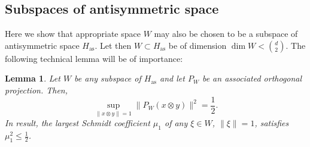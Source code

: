 \documentclass[reqno]{amsart}
\theoremstyle{plain}
\newtheorem{lemma}[theorem]{Lemma}
\theoremstyle{note}
\newcommand{\aspace}{H_{\mathrm{as}}}
\begin{document}
\subsection{Subspaces of antisymmetric space}
\label{sec:subspaces}

Here we show that appropriate space $W$ may also be chosen to be a subspace of antisymmetric space $\aspace$. Let then $W\subset\aspace$ be of dimension $\dim{W} < \binom{d}{2}$. The following technical lemma will be of importance:
\begin{lemma}\label{lemma:SchmidtOfHasSubspace}
Let $W$ be any subspace of $\aspace$ and let $P_W$ be an associated orthogonal projection. Then,
\begin{equation}
    \sup_{\|x \otimes y\| = 1}{\|P_W (x\otimes y)\|^{2}} = \frac{1}{2}.
\end{equation}
In result, the largest Schmidt coefficient $\mu_1$ of any $\xi\in W$, $\|\xi\| = 1$, satisfies $\mu_{1}^{2} \leqslant \frac{1}{2}$.
\end{lemma}
\end{document}
